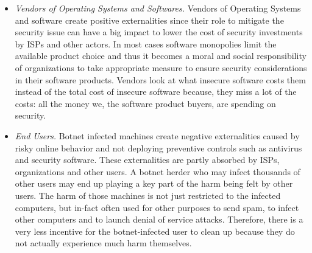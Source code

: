 \begin{itemize}
\item \textit{Vendors of Operating Systems and Softwares. } Vendors of Operating Systems and software create positive externalities since their role to mitigate the security issue can have a big impact to lower the cost of security investments by ISPs and other actors. In most cases software monopolies limit the available product choice and thus it becomes a moral and social responsibility of organizations to take appropriate measure to ensure security considerations in their software products. Vendors look at what insecure software costs them instead of the total cost of insecure software because, they miss a lot of the costs: all the money we, the software product buyers, are spending on security.
\item \textit{End Users.} Botnet infected machines create negative externalities caused by risky online behavior and not deploying preventive controls such as antivirus and security software. These externalities are partly absorbed by ISPs, organizations and other users. A botnet herder who may infect thousands of other users may end up playing a key part of the harm being felt by other users. The harm of those machines is not just restricted to the infected computers, but in-fact often used for other purposes to send spam, to infect other computers and to launch denial of service attacks. Therefore, there is a very less incentive for the botnet-infected user to clean up because they do not actually experience much harm themselves.





\end{itemize}
